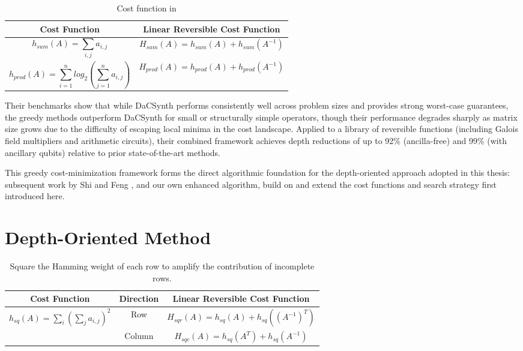 \begin{table}
    \centering
    \begin{tabularx}{\textwidth}{C|C}
        \hline
        Cost Function  & Linear Reversible Cost Function\\
         \hline
         $$h_{sum}(A) = \sum_{i,j}a_{i,j}$$ & $$H_{sum}(A) = h_{sum}(A) + h_{sum}(A^{-1})$$\\
         \hline
         $$h_{prod}(A) = \sum_{i=1}^{n}log_{2}(\sum_{j=1}^{n}a_{i,j})$$ & $$H_{prod}(A) = h_{prod}(A) + h_{prod}(A^{-1})$$\\
    \hline
\end{tabularx}
    \caption{Cost function in \cite{10.1145/3474226}}
    \label{tab:cost-function}
\end{table}

Their benchmarks show that while DaCSynth performs consistently well across problem sizes and provides strong worst-case guarantees, the greedy methods outperform DaCSynth for small or structurally simple operators, though their performance degrades sharply as matrix size grows due to the difficulty of escaping local minima in the cost landscape. Applied to a library of reversible functions (including Galois field multipliers and arithmetic circuits), their combined framework achieves depth reductions of up to 92\% (ancilla-free) and 99\% (with ancillary qubits) relative to prior state-of-the-art methods.

This greedy cost-minimization framework forms the direct algorithmic foundation for the depth-oriented approach adopted in this thesis: subsequent work by Shi and Feng \cite{cryptoeprint:2024/381}, and our own enhanced algorithm, build on and extend the cost functions and search strategy first introduced here.

\section{Depth-Oriented Method}

\begin{table}[htbp]
\centering
\begin{tabular}{c|c|c}
\hline
Cost Function & Direction  & Linear Reversible Cost Function\\
\hline
\multirow{2}{*}{$h_{sq}(A) = \sum_{i}(\sum_{j}a_{i,j})^{2}$} & Row & $H_{sqr}(A) = h_{sq}(A) + h_{sq}((A^{-1})^{T})$ \\ 
\cline{2-3}
& Column & $H_{sqc}(A) = h_{sq}(A^{T}) + h_{sq}(A^{-1})$ \\ 
\hline
\end{tabular}
	\caption{Square the Hamming weight of each row to amplify the contribution of incomplete rows.}
	\label{tab:square-hamming-weight}
\end{table}

